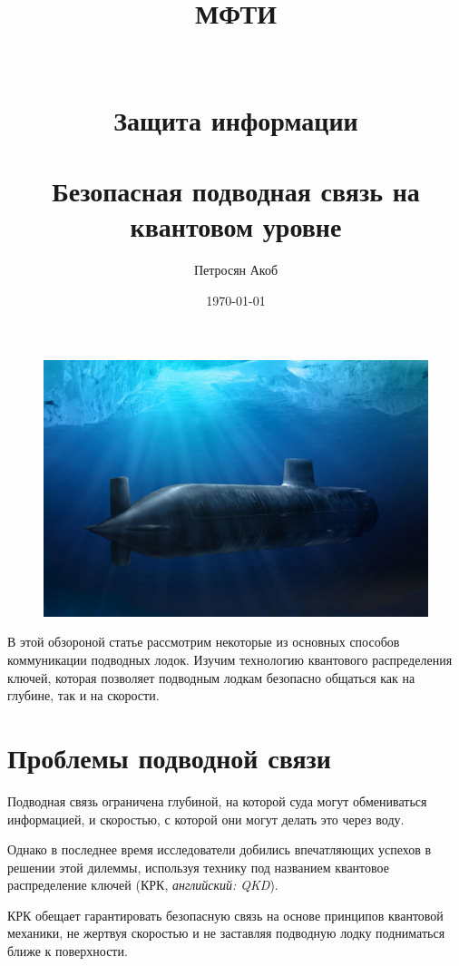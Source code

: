 \documentclass[a4paper,12pt]{article} %
\author{Петросян Акоб}
\title{ МФТИ \\ ~ \\ ~ \\ Защита информации \\ ~ \\ Безопасная подводная связь на квантовом уровне }
\date{\today}
\begin{document}

\maketitle
\newpage

\begin{figure}
  \includegraphics[width=\linewidth]{img/submarine.jpg}
  \label{fig:boat1}
\end{figure}

В этой обзороной статье рассмотрим некоторые из основных способов коммуникации подводных лодок. Изучим технологию квантового распределения ключей, которая позволяет подводным лодкам безопасно общаться как на глубине, так и на скорости.

\section*{Проблемы подводной связи}

\hspace{13pt} Подводная связь ограничена глубиной, на которой суда могут обмениваться информацией, и скоростью, с которой они могут делать это через воду.

Однако в последнее время исследователи добились впечатляющих успехов в решении этой дилеммы, используя технику под названием квантовое распределение ключей (КРК, {\it английский: QKD}).

КРК обещает гарантировать безопасную связь на основе принципов квантовой механики, не жертвуя скоростью и не заставляя подводную лодку подниматься ближе к поверхности.
\end{document}
